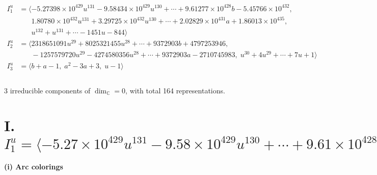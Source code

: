 \documentclass[1p]{elsarticle_modified}
\theoremstyle{definition}
\begin{document}
\begin{align*}
I^u_{1}&=\langle 
-5.27398\times10^{429} u^{131}-9.58434\times10^{429} u^{130}+\cdots+9.61277\times10^{428} b-5.45766\times10^{432},\\
\phantom{I^u_{1}}&\phantom{= \langle  }1.80780\times10^{432} u^{131}+3.29725\times10^{432} u^{130}+\cdots+2.02829\times10^{431} a+1.86013\times10^{435},\\
\phantom{I^u_{1}}&\phantom{= \langle  }u^{132}+u^{131}+\cdots-1451 u-844\rangle \\
I^u_{2}&=\langle 
2318651091 u^{29}+8025321455 u^{28}+\cdots+9372903 b+4797253946,\\
\phantom{I^u_{2}}&\phantom{= \langle  }-1257579720 u^{29}-4274580356 u^{28}+\cdots+9372903 a-2710745983,\;u^{30}+4 u^{29}+\cdots+7 u+1\rangle \\
I^u_{3}&=\langle 
b+a-1,\;a^2-3 a+3,\;u-1\rangle \\
\\
\end{align*}
\raggedright * 3 irreducible components of $\dim_{\mathbb{C}}=0$, with total 164 representations.\\
\newpage
\renewcommand{\arraystretch}{1}
\centering \section*{I. $I^u_{1}= \langle -5.27\times10^{429} u^{131}-9.58\times10^{429} u^{130}+\cdots+9.61\times10^{428} b-5.46\times10^{432},\;1.81\times10^{432} u^{131}+3.30\times10^{432} u^{130}+\cdots+2.03\times10^{431} a+1.86\times10^{435},\;u^{132}+u^{131}+\cdots-1451 u-844 \rangle$}
\flushleft \textbf{(i) Arc colorings}\\
\end{document}
